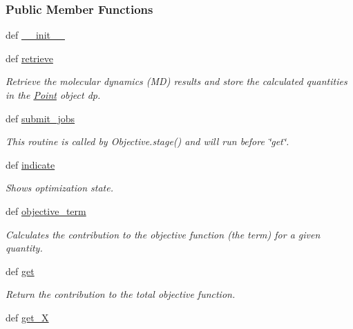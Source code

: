 \subsubsection*{Public Member Functions}
\begin{DoxyCompactItemize}
\item 
def \hyperlink{classforcebalance_1_1thermo_1_1Thermo_aaad140e3127a6fd98719db342b686ae4}{\-\_\-\-\_\-init\-\_\-\-\_\-}
\item 
def \hyperlink{classforcebalance_1_1thermo_1_1Thermo_a51a7c7849be08dbac153e8b2ff06afd8}{retrieve}
\begin{DoxyCompactList}\small\item\em Retrieve the molecular dynamics (M\-D) results and store the calculated quantities in the \hyperlink{classforcebalance_1_1thermo_1_1Point}{Point} object dp. \end{DoxyCompactList}\item 
def \hyperlink{classforcebalance_1_1thermo_1_1Thermo_a05ed95e5ac3c5b12048e6d928c5488b8}{submit\-\_\-jobs}
\begin{DoxyCompactList}\small\item\em This routine is called by Objective.\-stage() and will run before \char`\"{}get\char`\"{}. \end{DoxyCompactList}\item 
def \hyperlink{classforcebalance_1_1thermo_1_1Thermo_ae4c2b2c26951e2f72b40d39074d0979d}{indicate}
\begin{DoxyCompactList}\small\item\em Shows optimization state. \end{DoxyCompactList}\item 
def \hyperlink{classforcebalance_1_1thermo_1_1Thermo_a2578b390753ec351162dc429501b0760}{objective\-\_\-term}
\begin{DoxyCompactList}\small\item\em Calculates the contribution to the objective function (the term) for a given quantity. \end{DoxyCompactList}\item 
def \hyperlink{classforcebalance_1_1thermo_1_1Thermo_aa24e72e49064830a2ab069e6debb3dfa}{get}
\begin{DoxyCompactList}\small\item\em Return the contribution to the total objective function. \end{DoxyCompactList}\item 
def \hyperlink{classforcebalance_1_1target_1_1Target_a606dd136f195c267c05a2455405e5949}{get\-\_\-\-X}

\end{DoxyCompactItemize}
